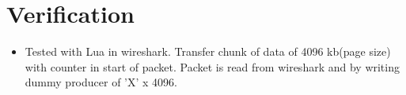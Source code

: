 \chapter{Verification} \label{chp:verification}
\begin{itemize}
	\item Tested with Lua in wireshark. Transfer chunk of data of 4096 kb(page size) with counter in start of packet. Packet is read from wireshark and by writing dummy producer of 'X' x 4096.
\end{itemize}
